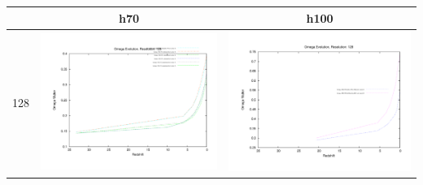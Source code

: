 \documentclass[a4paper,11pt,fleqn,oneside]{book}
\begin{document}
\begin{itemize}
\begin{table}
\begin{tabular}{l|c|c}
 & h70 & h100 \\
\hline 
 128 & \includegraphics[scale=0.2]{analysis/omega_evolution/omega_evolution_128_h70.pdf} & \includegraphics[scale=0.2]{analysis/omega_evolution/omega_evolution_128_h100.pdf} \\

\end{tabular}
\end{table}
\end{itemize}
\end{document}
